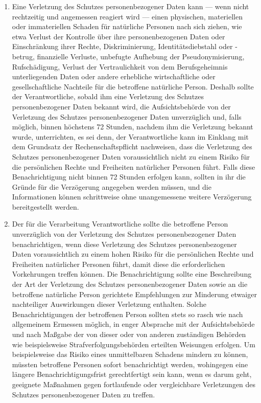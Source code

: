 \begin{enumerate}
   \item Eine Verletzung des Schutzes personenbezogener Daten kann — wenn nicht rechtzeitig und angemessen reagiert
    wird — einen physischen, materiellen oder immateriellen Schaden für natürliche Personen nach sich ziehen, wie etwa
    Verlust der Kontrolle über ihre personenbezogenen Daten oder Einschränkung ihrer Rechte, Diskriminierung,
    Identitätsdiebstahl oder -betrug, finanzielle Verluste, unbefugte Aufhebung der Pseudonymisierung, Rufschädigung,
    Verlust der Vertraulichkeit von dem Berufsgeheimnis unterliegenden Daten oder andere erhebliche wirtschaftliche
    oder gesellschaftliche Nachteile für die betroffene natürliche Person. Deshalb sollte der Verantwortliche, sobald
    ihm eine Verletzung des Schutzes personenbezogener Daten bekannt wird, die Aufsichtsbehörde von der Verletzung des
    Schutzes personenbezogener Daten unverzüglich und, falls möglich, binnen höchstens 72 Stunden, nachdem ihm die
    Verletzung bekannt wurde, unterrichten, es sei denn, der Verantwortliche kann im Einklang mit dem Grundsatz der
    Rechenschaftspflicht nachweisen, dass die Verletzung des Schutzes personenbezogener Daten voraussichtlich nicht zu
    einem Risiko für die persönlichen Rechte und Freiheiten natürlicher Personen führt. Falls diese Benachrichtigung
    nicht binnen 72 Stunden erfolgen kann, sollten in ihr die Gründe für die Verzögerung angegeben werden müssen, und
    die Informationen können schrittweise ohne unangemessene weitere Verzögerung bereitgestellt werden.%
   \label{itm:eg-85}
   

   \item Der für die Verarbeitung Verantwortliche sollte die betroffene Person unverzüglich von der Verletzung des
    Schutzes personenbezogener Daten benachrichtigen, wenn diese Verletzung des Schutzes personenbezogener Daten
    voraussichtlich zu einem hohen Risiko für die persönlichen Rechte und Freiheiten natürlicher Personen führt, damit
    diese die erforderlichen Vorkehrungen treffen können. Die Benachrichtigung sollte eine Beschreibung der Art der
    Verletzung des Schutzes personenbezogener Daten sowie an die betroffene natürliche Person gerichtete Empfehlungen
    zur Minderung etwaiger nachteiliger Auswirkungen dieser Verletzung enthalten. Solche Benachrichtigungen der
    betroffenen Person sollten stets so rasch wie nach allgemeinem Ermessen möglich, in enger Absprache mit der
    Aufsichtsbehörde und nach Maßgabe der von dieser oder von anderen zuständigen Behörden wie beispielsweise
    Strafverfolgungsbehörden erteilten Weisungen erfolgen. Um beispielsweise das Risiko eines unmittelbaren Schadens
    mindern zu können, müssten betroffene Personen sofort benachrichtigt werden, wohingegen eine längere
    Benachrichtigungsfrist gerechtfertigt sein kann, wenn es darum geht, geeignete Maßnahmen gegen fortlaufende oder
    vergleichbare Verletzungen des Schutzes personenbezogener Daten zu treffen.%
   \label{itm:eg-86}
   

\end{enumerate}
